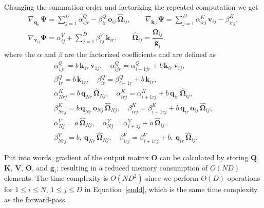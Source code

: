 Changing the summation order and factorizing the repeated computation we get
\begin{gather}
    \nabla_{\mathbf{q}_{ir}}\mathbf{\Psi} =\sum_{j=1}^{D}\alpha_{ijr}^{Q}-\beta_{ir}^{Q}\,\mathbf{o}_{ij}\,\hat{\mathbf{\Omega}}_{ij},\label{back1}\quad\quad
    \nabla_{\mathbf{k}_{ir}}\mathbf{\Psi} = \sum_{j=1}^{D}\alpha_{irj}^{K}\,\mathbf{v}_{ij} - \beta_{irj}^{K},\\
    \nabla_{\mathbf{v}_{ij}}\mathbf{\Psi} = \alpha_{ij}^{V} + \sum_{j=1}^{D}\beta_{rj}^{V}\,\mathbf{k}_{ir},\quad\quad
    \hat{\mathbf{\Omega}}_{ij} = \dfrac{\mathbf{\Omega}_{ij}}{\mathbf{g}_{i}}.\label{back2}
\end{gather}
where the $\alpha$ and $\beta$ are the factorized coefficients and are defined as
\begin{gather}
    \alpha_{1jr}^{Q} = b\,\mathbf{k}_{1r}\,\mathbf{v}_{1j},\quad \alpha_{ijr}^{Q} = \alpha_{i-1jr}^{Q} + b\,\mathbf{k}_{ir}\,\mathbf{v}_{ij},\nonumber\\
    \beta_{1r}^{Q} = b\,\mathbf{k}_{1r},\quad \beta_{ir}^{Q} = \beta_{i-1r}^{Q} + b\,\mathbf{k}_{ir},\nonumber\\
    \alpha_{Nrj}^{K} = b\,\mathbf{q}_{Nr}\,\hat{\mathbf{\Omega}}_{Nj},\quad \alpha_{irj}^{K} = \alpha_{i+1rj}^{K} + b\,\mathbf{q}_{ir}\,\hat{\mathbf{\Omega}}_{ij},\nonumber\\
    \beta_{Nrj}^{K} = b\,\mathbf{q}_{Nr}\,\mathbf{o}_{Nj}\,\hat{\mathbf{\Omega}}_{Nj},\quad \beta_{irj}^{K} = \beta_{i+1rj}^{K} + b\,\mathbf{q}_{ir}\,\mathbf{o}_{ij}\,\hat{\mathbf{\Omega}}_{ij},\nonumber\\
    \alpha_{Nj}^{V} = a\,\hat{\mathbf{\Omega}}_{Nj},\quad \alpha_{Nj}^{V} = \alpha_{i+1j}^{V} + a\,\hat{\mathbf{\Omega}}_{ij},\nonumber\\
    \beta_{Nrj}^{V} = b,\ \mathbf{q}_{Nr}\,\hat{\mathbf{\Omega}}_{Nj},\quad \beta_{irj}^{V} = \beta_{i+1rj}^{V} + b,\ \mathbf{q}_{ir}\,\hat{\mathbf{\Omega}}_{ij}.\label{endd}
\end{gather}


\par Put into words, gradient of the output matrix $\mathbf{O}$ can be calculated by storing $\mathbf{Q}$, $\mathbf{K}$, $\mathbf{V}$, $\mathbf{O}$, and $\mathbf{g}_i$; resulting in a reduced memory consumption of $O(ND)$ elements. The time complexity is $O(ND^2)$ since we perform $O(D)$ operations for $1\leq i\leq N,\,1\leq j\leq D$ in Equation~\ref{endd}, which is the same time complexity as the forward-pass. 

